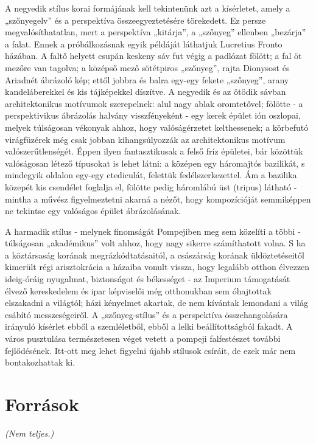 	A negyedik stílus korai formájának kell tekintenünk azt a kísérletet, amely a „szőnyegelv” és a perspektíva összeegyeztetésére törekedett. Ez persze megvalósíthatatlan, mert a
	perspektíva „kitárja”, a „szőnyeg” ellenben „bezárja” a falat. Ennek a próbálkozásnak
	egyik példáját láthatjuk Lucretius Fronto házában. A faltő helyett csupán keskeny sáv fut
	végig a padlózat fölött; a fal öt mezőre van tagolva; a középső mező sötétpiros „szőnyeg”, rajta Dionysost és Ariadnét ábrázoló kép; ettől jobbra és balra egy-egy fekete „szőnyeg”, arany kandeláberekkel és kis tájképekkel díszítve.
	A negyedik és az ötödik sávban architektonikus motívumok szerepelnek: alul nagy ablak
	oromtetővel; fölötte - a perspektivikus ábrázolás halvány visszfényeként - egy kerek
	épület ión oszlopai, melyek túlságosan vékonyak ahhoz, hogy valóságérzetet
	kelthessenek; a körbefutó virágfüzérek még csak jobban kihangsúlyozzák az
	architektonikus motívum valószerűtlenségét. Éppen ilyen fantasztikusak a felső fríz
	épületei, bár közöttük valóságosan létező típusokat is lehet látni: a középen egy
	háromajtós bazilikát, s mindegyik oldalon egy-egy ctediculát, felettük fedélszerkezettel.
	Ám a bazilika közepét kis csendélet foglalja el, fölötte pedig háromlábú üst (tripus)
	látható - mintha a művész figyelmeztetni akarná a nézőt, hogy kompozícióját
	semmiképpen ne tekintse egy valóságos épület ábrázolásának.
	
	A harmadik stílus - melynek finomságát Pompejiben meg sem közelíti a többi - túlságosan „akadémikus” volt ahhoz, hogy nagy sikerre számíthatott volna. S ha a
	köztársaság korának megrázkódtatásaitól, a császárság korának üldöztetéseitől kimerült 
	régi arisztokrácia a házaiba vonult vissza, hogy legalább otthon élvezzen ideig-óráig
	nyugalmat, biztonságot és békességet - az Imperium támogatását élvező kereskedelem és
	ipar képviselői még otthonukban sem óhajtottak elszakadni a világtól; házi kényelmet
	akartak, de nem kívántak lemondani a világ csábító messzeségeiről.
	A „szőnyeg-stílus” és a perspektíva összehangolására irányuló kísérlet ebből a
	szemléletből, ebből a lelki beállítottságból fakadt. A város pusztulása természetesen véget
	vetett a pompeji falfestészet további fejlődésének. Itt-ott meg lehet figyelni újabb stílusok
	csíráit, de ezek már nem bontakozhattak ki.

\section{Források}

\textit{(Nem teljes.)}

